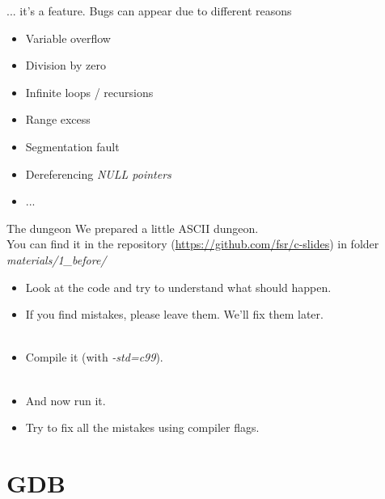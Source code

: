 
\begin{frame}{... it's a feature.}
	Bugs can appear due to different reasons
	\begin{itemize}
		\item Variable overflow
		\item Division by zero
		\item Infinite loops / recursions
		\item Range excess
		\item Segmentation fault
		\item Dereferencing \textit{NULL pointers}
		\item ...
	\end{itemize}
\end{frame}


\begin{frame}{The dungeon}
	We prepared a little ASCII dungeon.\\
	You can find it in the repository (\url{https://github.com/fsr/c-slides}) in folder \textit{materials/1\_before/}\\
	\begin{itemize}
		\item Look at the code and try to understand what should happen.
		\item If you find mistakes, please leave them. We'll fix them later.
		\\\ 
		\item Compile it (with \textit{-std=c99}).
		\\\ 
		\item And now run it.
		\pause
		\item Try to fix all the mistakes using compiler flags.
	\end{itemize}
\end{frame}

\section{GDB}


